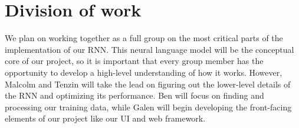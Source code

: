 \section{Division of work}\label{sec:division}
We plan on working together as a full group on the most critical parts of the
implementation of our RNN.  This neural language model will be the conceptual
core of our project, so it is important that every group member has the opportunity
to develop a high-level understanding of how it works.  However, Malcolm and 
Tenzin will take the lead on figuring out the lower-level details of the RNN
and optimizing its performance.  Ben will focus on finding and processing our
training data, while Galen will begin developing the front-facing elements of
our project like our UI and web framework.
